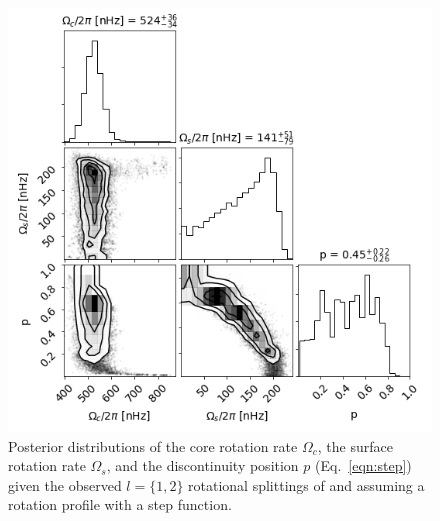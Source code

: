 \begin{figure}
\centering
    \includegraphics[width=\textwidth]{Figures/subgiant_chapter_figures/12_corner.png}
    \caption[Posterior distributions of core rotation rate $\Omega_c${,} the surface rotation rate $\Omega_s${,} and the discontinuity position $p$ given the observed $l=\{1{,}2\}$ rotational splittings of KIC 12508433 and assuming a rotation profile with a step function.]{Posterior distributions of the core rotation rate $\Omega_c$, the surface rotation rate $\Omega_s$, and the discontinuity position $p$ (Eq.~\ref{eqn:step}) given the observed $l=\{1,2\}$ rotational splittings of \thestar{} and assuming a rotation profile with a step function.}
    \label{fig:kic-corner}
\end{figure}

